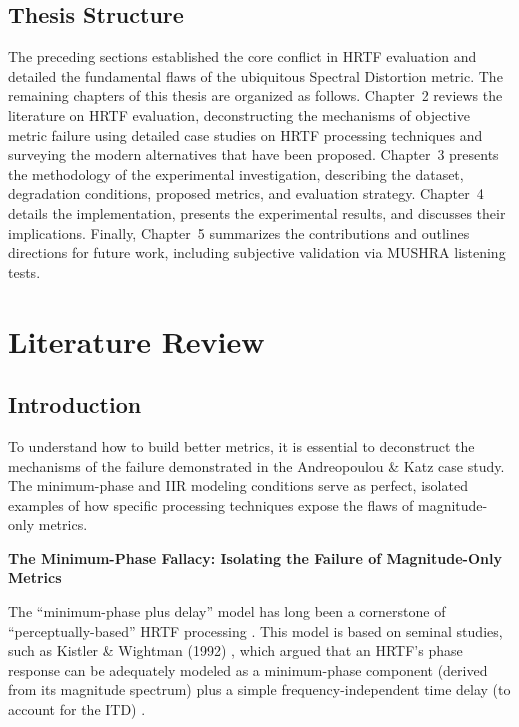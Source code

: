 \documentclass[12pt,a4paper]{article}
\begin{document}
\subsection{Thesis Structure}

The preceding sections established the core conflict in HRTF evaluation and detailed the fundamental flaws of the ubiquitous Spectral Distortion metric. The remaining chapters of this thesis are organized as follows. Chapter~2 reviews the literature on HRTF evaluation, deconstructing the mechanisms of objective metric failure using detailed case studies on HRTF processing techniques and surveying the modern alternatives that have been proposed. Chapter~3 presents the methodology of the experimental investigation, describing the dataset, degradation conditions, proposed metrics, and evaluation strategy. Chapter~4 details the implementation, presents the experimental results, and discusses their implications. Finally, Chapter~5 summarizes the contributions and outlines directions for future work, including subjective validation via MUSHRA listening tests.



\newpage
\section{Literature Review}

\subsection{Introduction}

To understand how to build better metrics, it is essential to deconstruct the mechanisms of the failure demonstrated in the Andreopoulou \& Katz \cite{andreopoulou2022} case study. The minimum-phase and IIR modeling conditions serve as perfect, isolated examples of how specific processing techniques expose the flaws of magnitude-only metrics.

\textbf{The Minimum-Phase Fallacy: Isolating the Failure of Magnitude-Only Metrics}

The ``minimum-phase plus delay'' model has long been a cornerstone of ``perceptually-based'' HRTF processing \cite{andreopoulou2022}. This model is based on seminal studies, such as Kistler \& Wightman (1992) \cite{kistler1992}, which argued that an HRTF's phase response can be adequately modeled as a minimum-phase component (derived from its magnitude spectrum) plus a simple frequency-independent time delay (to account for the ITD) \cite{kistler1992}.
\end{document}

